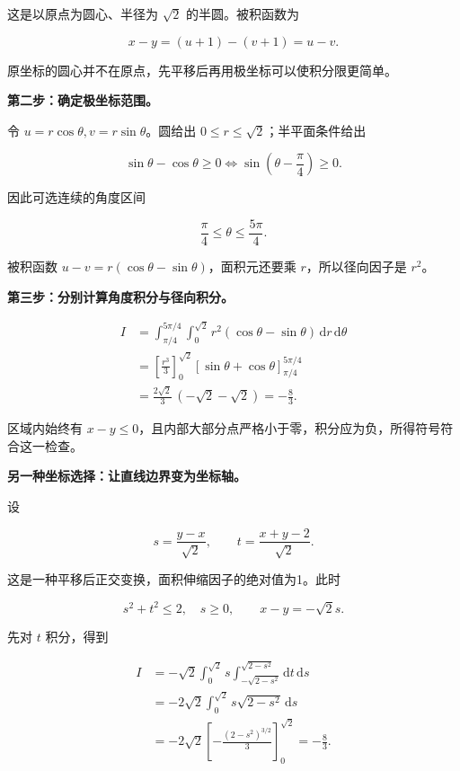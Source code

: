 \documentclass[UTF8,11pt,fontset=windows]{ctexart}
\begin{document}
这是以原点为圆心、半径为 $\sqrt2$ 的半圆。被积函数为

$$
x-y=(u+1)-(v+1)=u-v.
$$

原坐标的圆心并不在原点，先平移后再用极坐标可以使积分限更简单。

\textbf{第二步：确定极坐标范围。}

令 $u=r\cos\theta,v=r\sin\theta$。圆给出 $0\le r\le\sqrt2$；半平面条件给出

$$
\sin\theta-\cos\theta\ge0
\Longleftrightarrow
\sin\left(\theta-\frac\pi4\right)\ge0.
$$

因此可选连续的角度区间

$$
\frac\pi4\le\theta\le\frac{5\pi}{4}.
$$

被积函数 $u-v=r(\cos\theta-\sin\theta)$，面积元还要乘 $r$，所以径向因子是 $r^2$。

\textbf{第三步：分别计算角度积分与径向积分。}

$$
\begin{aligned}
I&=\int_{\pi/4}^{5\pi/4}\int_0^{\sqrt2}
 r^2(\cos\theta-\sin\theta)\,\mathrm dr\,\mathrm d\theta\\
&=\left[\frac{r^3}{3}\right]_0^{\sqrt2}
\left[\sin\theta+\cos\theta\right]_{\pi/4}^{5\pi/4}\\
&=\frac{2\sqrt2}{3}\,(-\sqrt2-\sqrt2)
=\boxed{-\frac83}.
\end{aligned}
$$

区域内始终有 $x-y\le0$，且内部大部分点严格小于零，积分应为负，所得符号符合这一检查。

\textbf{另一种坐标选择：让直线边界变为坐标轴。}

设

$$
s=\frac{y-x}{\sqrt2},\qquad t=\frac{x+y-2}{\sqrt2}.
$$

这是一种平移后正交变换，面积伸缩因子的绝对值为1。此时

$$
s^2+t^2\le2,\quad s\ge0,\qquad x-y=-\sqrt2s.
$$

先对 $t$ 积分，得到

$$
\begin{aligned}
I&=-\sqrt2\int_0^{\sqrt2}s
\int_{-\sqrt{2-s^2}}^{\sqrt{2-s^2}}\mathrm dt\,\mathrm ds\\
&=-2\sqrt2\int_0^{\sqrt2}s\sqrt{2-s^2}\,\mathrm ds\\
&=-2\sqrt2\left[-\frac{(2-s^2)^{3/2}}3\right]_0^{\sqrt2}
=-\frac83.
\end{aligned}
$$

\clearpage
\end{document}
